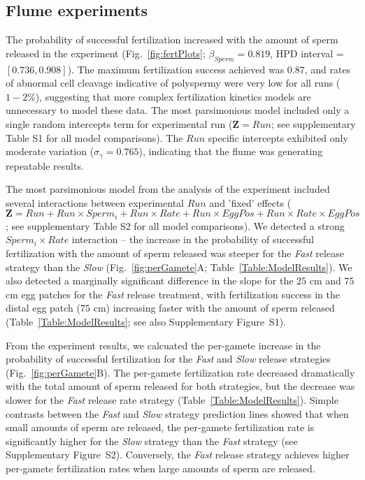 \documentclass{article}
\begin{document}
	\subsection*{Flume experiments}

	The probability of successful fertilization increased with the amount of sperm released in the  experiment (Fig.~\ref{fig:fertPlots}; $\beta_{Sperm} = 0.819$, HPD interval = $[0.736,0.908]$). The maximum fertilization success achieved was $0.87$, and rates of abnormal cell cleavage indicative of polyspermy were very low for all runs ($1-2\%$), suggesting that more complex fertilization kinetics models are unnecessary to model these data. The most parsimonious model included only a single random intercepts term for experimental run ($\mathbf{Z} = Run$; see supplementary Table S1 for all model comparisons). The $Run$ specific intercepts exhibited only moderate variation ($\sigma_{\gamma} = 0.765$), indicating that the flume was generating repeatable results.

	The most parsimonious model from the analysis of the  experiment included several interactions between experimental $Run$ and 'fixed' effects ($\mathbf{Z} = Run + Run \times Sperm_i + Run \times Rate + Run \times EggPos + Run \times Rate \times EggPos$; see supplementary Table S2 for all model comparisons). We detected a strong $Sperm_i \times Rate$ interaction -- the increase in the probability of successful fertilization with the amount of sperm released was steeper for the \textit{Fast} release strategy than the \textit{Slow} (Fig.~\ref{fig:perGamete}A; Table~\ref{Table:ModelResults}). We also detected a marginally significant difference in the slope for the $25$ cm and $75$ cm egg patches for the \textit{Fast} release treatment, with fertilization success in the distal egg patch ($75$ cm) increasing faster with the amount of sperm released (Table~\ref{Table:ModelResults}; see also Supplementary Figure~S1).

	From the  experiment results, we calcuated the per-gamete increase in the probability of successful fertilization for the \textit{Fast} and \textit{Slow} release strategies (Fig.~\ref{fig:perGamete}B). The per-gamete fertilization rate decreased dramatically with the total amount of sperm released for both strategies, but the decrease was slower for the \textit{Fast} release rate strategy (Table~\ref{Table:ModelResults}). Simple contrasts between the \textit{Fast} and \textit{Slow} strategy prediction lines showed that when small amounts of sperm are released, the per-gamete fertilization rate is significantly higher for the \textit{Slow} strategy than the \textit{Fast} strategy (see Supplementary Figure~S2). Conversely, the \textit{Fast} release strategy achieves higher per-gamete fertilization rates when large amounts of sperm are released.
\end{document}
